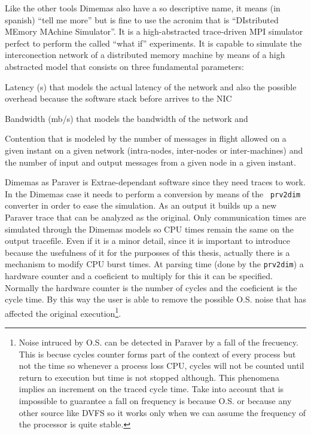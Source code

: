 Like the other tools Dimemas also have a so descriptive name, it means (in
spanish) ``tell me more'' but is fine to use the acronim that is ``DIstributed
MEmory MAchine Simulator''. It is a high-abstracted trace-driven MPI simulator
perfect to perform the called ``what if'' experiments. It is capable to simulate
the interconection network of a distributed memory machine by means of a high
abstracted model that consists on three fundamental parameters:
\begin{enumerate*}[label=\roman*)]
  \item Latency (s) that models the actual latency of the network and also the
    possible overhead because the software stack before arrives to the NIC
  \item Bandwidth (mb/s) that models the bandwidth of the network and
  \item Contention that is modeled by the number of messages in flight 
    allowed on a given instant on a given network (intra-nodes, inter-nodes or
    inter-machines) and the number of input and output messages from a given
    node in a given instant.
\end{enumerate*}

Dimemas as Paraver is Extrae-dependant software since they need traces to work.
In the Dimemas case it needs to perform a conversion by means of the {\tt
prv2dim} converter in order to ease the simulation. As an output it builds up a
new Paraver trace that can be analyzed as the original. Only communication times 
are simulated through the Dimemas models so CPU times
remain the same on the output tracefile. Even if it is a minor detail, since it
is important to introduce because the usefulness of it for the purposses of this
thesis, actually there is a mechanism to modify CPU burst times. At parsing time
(done by the {\tt prv2dim}) a hardware counter and a coeficient to multiply 
for this it can be specified. Normally the hardware counter is the number of 
cycles and the coeficient is the cycle time. By this way the user is able to 
remove the possible O.S. noise that has affected the original
execution\footnote{Noise intruced by O.S. can be detected in Paraver by a fall 
  of the frecuency. This is becuse cycles counter forms part of the context of
  every process but not the time so whenever a process loss CPU, cycles will not
  be counted until return to execution but time is not stopped although. This
  phenomena implies an increment on the traced cycle time. Take into account
  that is impossible to guarantee a fall on frequency is because O.S. or because
  any other source like DVFS so it works only when we can assume the frequency
of the processor is quite stable.}.

